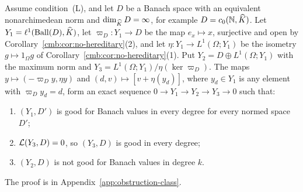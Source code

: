 \begin{theorem}\label{cmb:thm:three-space}
Assume condition~\textup{(L)}, and let $D$ be a Banach space with an equivalent nonarchimedean norm and $\dim_{\widehat K}D=\infty$,
for example $D=c_0(\mathbb N,\widehat K)$. Let $Y_1=\ell^1(\operatorname{Ball}(D),\widehat K)$, let $\varpi_D\colon Y_1\to D$ be the map
$e_x\mapsto x$, surjective and open by Corollary~\ref{cmb:cor:no-hereditary}(2), and let
$\eta\colon Y_1\to L^1(\Omega;Y_1)$ be the isometry $g\mapsto1_\Omega g$ of Corollary~\ref{cmb:cor:no-hereditary}(1). Put
$Y_2=D\oplus L^1(\Omega;Y_1)$ with the maximum norm and $Y_3=L^1(\Omega;Y_1)/\eta(\ker\varpi_D)$. The maps
$y\mapsto(-\varpi_Dy,\eta y)$ and $(d,v)\mapsto[v+\eta(y_d)]$, where $y_d\in Y_1$
is any element with $\varpi_Dy_d=d$, form an exact sequence $0\to Y_1\to Y_2\to Y_3\to0$ such that:
\begin{enumerate}
\item $(Y_1,D')$ is good for Banach values in every degree for every normed space $D'$;
\item $\mathcal L(Y_3,D)=0$, so $(Y_3,D)$ is good in every degree;
\item $(Y_2,D)$ is not good for Banach values in degree $k$.
\end{enumerate}
\end{theorem}

The proof is in Appendix~\ref{app:obstruction-class}.
